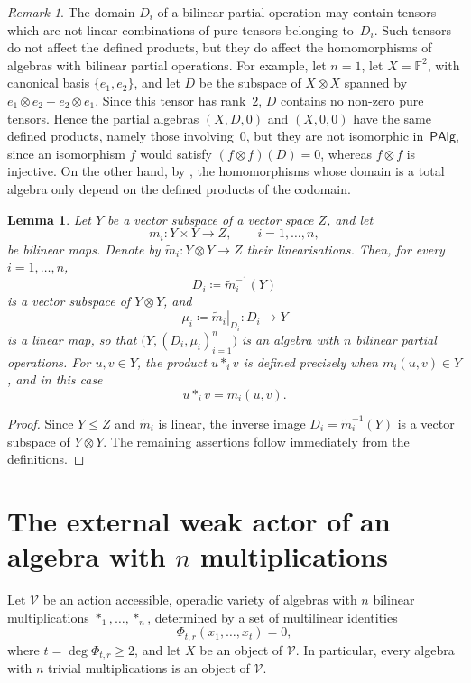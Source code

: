 \documentclass[reqno,a4paper]{amsart}
\theoremstyle{plain}
\newtheorem{lemma}[subsection]{Lemma}
\theoremstyle{definition}
\theoremstyle{remark}
\newtheorem{remark}[subsection]{Remark}
\numberwithin{equation}{section}
\newcommand{\F}{\mathbb{F}}
\newcommand{\V}{\mathcal{V}}
\newcommand{\PAlg}{\ensuremath{\mathsf{PAlg}}}
\begin{document}
\begin{remark}\label{RemarkNonPureTensors}
The domain $D_i$ of a bilinear partial operation may contain tensors which are not linear combinations of pure tensors belonging to~$D_i$. Such tensors do not affect the defined products, but they do affect the homomorphisms of algebras with bilinear partial operations. For example, let $n=1$, let $X=\F^2$, with canonical basis $\{e_1,e_2\}$, and let $D$ be the subspace of $X\otimes X$ spanned by $e_1\otimes e_2+e_2\otimes e_1$. Since this tensor has rank~$2$, $D$ contains no non-zero pure tensors. Hence the partial algebras $(X,D,0)$ and $(X,0,0)$ have the same defined products, namely those involving~$0$, but they are not isomorphic in~$\PAlg$, since an isomorphism $f$ would satisfy $(f\otimes f)(D)=0$, whereas $f\otimes f$ is injective. On the other hand, by , the homomorphisms whose domain is a total algebra only depend on the defined products of the codomain.
\end{remark}

\begin{lemma}\label{LemPartialFromBilinearN}
Let $Y$ be a vector subspace of a vector space $Z$, and let
\[
m_i\colon Y\times Y\to Z,
\qquad i=1,\ldots,n,
\]
be bilinear maps. Denote by $\widetilde m_i\colon Y\otimes Y\to Z$ their linearisations. Then, for every $i=1,\ldots,n$,
\[
D_i\coloneqq\widetilde m_i^{-1}(Y)
\]
is a vector subspace of $Y\otimes Y$, and
\[
\mu_i\coloneqq\left.\widetilde m_i\right|_{D_i}
\colon D_i\to Y
\]
is a linear map, so that $\bigl(Y,(D_i,\mu_i)_{i=1}^n\bigr)$ is an algebra with $n$ bilinear partial operations. For $u,v\in Y$, the product $u\ast_i v$ is defined precisely when $m_i(u,v)\in Y$, and in this case
\[
u\ast_i v=m_i(u,v).
\]
\end{lemma}

\begin{proof}
Since $Y\leq Z$ and $\widetilde m_i$ is linear, the inverse image
$D_i=\widetilde m_i^{-1}(Y)$ is a vector subspace of $Y\otimes Y$.
The remaining assertions follow immediately from the definitions.
\end{proof}

\section{The external weak actor of an algebra with \texorpdfstring{$n$}{n} multiplications}\label{SecExternalWeakActorN}

Let $\V$ be an action accessible, operadic variety of algebras with $n$ bilinear multiplications $\ast_1,\ldots,\ast_n$, determined by a set of multilinear identities
\[
\Phi_{t,r}(x_1,\ldots,x_t)=0,
\]
where $t=\deg \Phi_{t,r}\geq2$, and let $X$ be an object of $\V$. In particular, every algebra with $n$ trivial multiplications is an object of $\V$.
\end{document}
